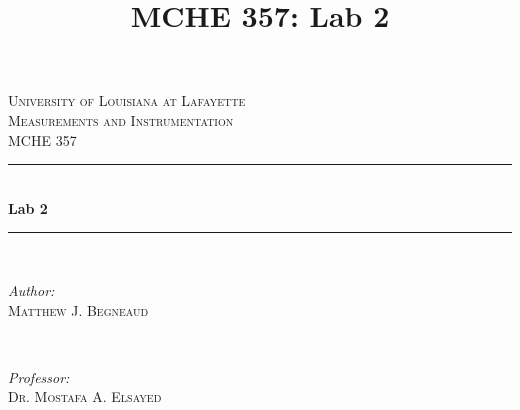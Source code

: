 \documentclass[12pt]{article}
\title{MCHE 357: Lab 2}
\begin{document}




\begin{titlepage}

\newcommand{\HRule}{\rule{\linewidth}{0.5mm}} %

\center %
 

\textsc{\LARGE University of Louisiana at Lafayette}\\[1.5cm] %
\textsc{\Large Measurements and Instrumentation}\\[0.5cm] %
\textsc{\large MCHE 357}\\[0.5cm] %


\HRule \\[0.4cm]
{ \huge \bfseries Lab 2}\\[0.4cm] %
\HRule \\[1.5cm]
 

\begin{minipage}{0.4\textwidth}
\begin{flushleft} \large
\emph{Author:}\\
\textsc{Matthew J. Begneaud} \\%
\end{flushleft}
\end{minipage}
~
\begin{minipage}{0.4\textwidth}
\begin{flushright} \large
\emph{Professor:} \\
\textsc{Dr. Mostafa A. Elsayed} %
\end{flushright}
\end{minipage}\\[1.5cm]


\end{titlepage}
\end{document}
